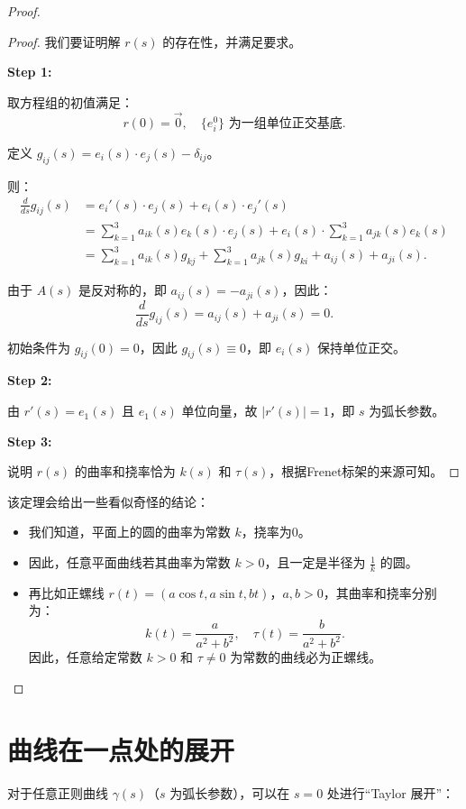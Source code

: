 \documentclass[lang=cn,10pt,thmcnt=section]{elegantbook}
\begin{document}
\begin{proof}
\begin{proof}
    我们要证明解 $r(s)$ 的存在性，并满足要求。
    
    \textbf{Step 1:}
    
    取方程组的初值满足：
    \[
    r(0) = \vec{0}, \quad \{e_i^0\} \text{ 为一组单位正交基底}.
    \]
    
    定义 \(g_{ij}(s) = e_i(s) \cdot e_j(s) - \delta_{ij}\)。
    
    则：
    \begin{align*}
    \frac{d}{ds} g_{ij}(s) &= e_i'(s) \cdot e_j(s) + e_i(s) \cdot e_j'(s) \\
    &= \sum_{k=1}^3 a_{ik}(s) e_k(s) \cdot e_j(s) + e_i(s) \cdot \sum_{k=1}^3 a_{jk}(s) e_k(s) \\
    &= \sum_{k=1}^3 a_{ik}(s) g_{kj} + \sum_{k=1}^3 a_{jk}(s) g_{ki} + a_{ij}(s) + a_{ji}(s).
    \end{align*}
    
    由于 \(A(s)\) 是反对称的，即 \(a_{ij}(s) = -a_{ji}(s)\)，因此：
    \[
    \frac{d}{ds} g_{ij}(s) = a_{ij}(s) + a_{ji}(s) = 0.
    \]
    
    初始条件为 \(g_{ij}(0) = 0\)，因此 \(g_{ij}(s) \equiv 0\)，即 \(e_i(s)\) 保持单位正交。
    
    \textbf{Step 2:}
    
    由 \(r'(s) = e_1(s)\) 且 \(e_1(s)\) 单位向量，故 \(|r'(s)| = 1\)，即 \(s\) 为弧长参数。
    
    \textbf{Step 3:}
    
    说明 \(r(s)\) 的曲率和挠率恰为 \(k(s)\) 和 \(\tau(s)\)，根据Frenet标架的来源可知。
    \end{proof}
    
    \begin{corollary}
    该定理会给出一些看似奇怪的结论：
    \begin{itemize}
        \item 我们知道，平面上的圆的曲率为常数 \(k\)，挠率为0。
        \item 因此，任意平面曲线若其曲率为常数 \(k > 0\)，且一定是半径为 \(\frac{1}{k}\) 的圆。
        \item 再比如正螺线 \(r(t) = (a \cos t, a \sin t, bt)\)，\(a, b > 0\)，其曲率和挠率分别为：
        \[
        k(t) = \frac{a}{a^2 + b^2}, \quad \tau(t) = \frac{b}{a^2 + b^2}.
        \]
        因此，任意给定常数 \(k > 0\) 和 \(\tau \neq 0\) 为常数的曲线必为正螺线。
    \end{itemize}
    \end{corollary}
\end{proof}
\section{曲线在一点处的展开}
对于任意正则曲线 \(\gamma(s)\)（\(s\) 为弧长参数），可以在 \(s=0\) 处进行“Taylor 展开”：
\end{document}
